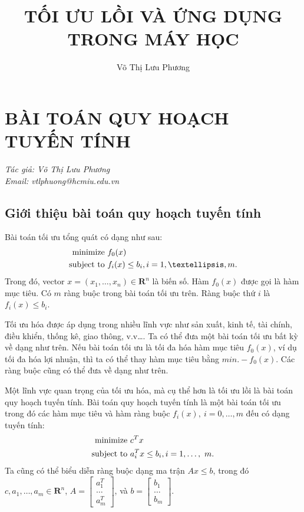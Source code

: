 \documentclass{book}
\begin{document}
\title{TỐI ƯU LỒI VÀ ỨNG DỤNG TRONG MÁY HỌC}
\author{Võ Thị Lưu Phương}


\maketitle

\chapter{BÀI TOÁN QUY HOẠCH TUYẾN TÍNH}
\textit{Tác giả: Võ Thị Lưu Phương\\Email: vtlphuong@hcmiu.edu.vn}

\section{Giới thiệu bài toán quy hoạch tuyến tính}

Bài toán tối ưu tổng quát có dạng như sau:
\begin{align}
\rm{minimize}~  & f_0(x)\\
\rm{subject~to}~ &f_i(x) \leq b_i ,i=1,…,m.
\end{align}
Trong đó, vector $x=(x_1,\ldots,x_n)\in \mathbf{R}^n$ là biến số. Hàm $f_0(x)$ được gọi là hàm mục tiêu. Có $m$ ràng buộc trong bài toán tối ưu trên.  Ràng buộc thứ $i$ là $f_i(x) \leq b_i$.

Tối ưu hóa được áp dụng trong nhiều lĩnh vực như sản xuất, kinh tế, tài chính, điều khiển, thống kê, giao thông, v.v…. Ta có thể đưa một bài toán tối ưu bất kỳ về dạng như trên. Nếu bài toán tối ưu là tối đa hóa hàm mục tiêu $f_0(x)$, ví dụ tối đa hóa lợi nhuận, thì ta có thể thay hàm mục tiêu bằng  $min. -f_0(x)$. Các ràng buộc cũng có thể đưa về dạng như trên.


Một lĩnh vực quan trọng của tối ưu hóa, mà cụ thể hơn là tối ưu lồi là bài toán quy hoạch tuyến tính. Bài toán quy hoạch tuyến tính là một bài toán tối ưu trong đó các hàm mục tiêu và hàm ràng buộc $f_i(x),\ i=0,\ldots,m$ đếu có dạng tuyến tính:
\begin{align}
\rm{minimize}~   &c^Tx\\
\rm{subject~to}~ &a_i^Tx \leq b_i ,i=1,\ldots,\ m.
\end{align}
Ta cũng có thể biểu diễn ràng buộc dạng ma trận $Ax \leq b$, trong đó $c,a_1,\ldots,a_m \in \mathbf{R}^n$, $A=\left[\begin{matrix}a_1^T\\
\ldots\\a_m^T
\end{matrix}\right]$, và $b=\left[\begin{matrix}b_1\\
\ldots\\
b_m
\end{matrix}\right]$.
\end{document}
